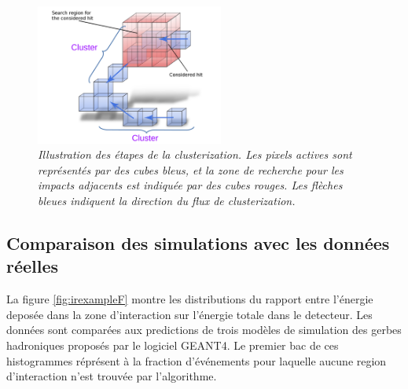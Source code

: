 \begin{figure}
	\centering
	\includegraphics[width=0.55\textwidth]{ECAL/graphics/demo-v3.pdf}
	\caption{\label{fig:democlusterF} \sl Illustration des étapes de la clusterization. Les pixels actives sont représentés par des cubes bleus, et la zone de recherche pour les impacts adjacents est indiquée par des cubes rouges. Les flèches bleues indiquent la direction du flux de clusterization.}
\end{figure}

\newpage
\subsection*{Comparaison des simulations avec les données réelles}
La figure \ref{fig:irexampleF} montre les distributions du rapport entre l'énergie deposée dans la zone d'interaction sur l'énergie totale dans le detecteur. Les données sont comparées aux predictions de trois modèles de simulation des gerbes hadroniques proposés par le logiciel GEANT4.  
Le premier bac de ces histogrammes  réprésent à la fraction d'événements pour laquelle aucune region d'interaction n'est trouvée par l'algorithme.


